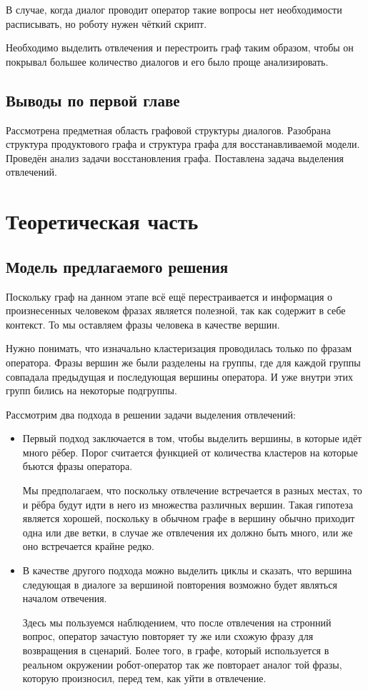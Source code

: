 \documentclass[specification,annotation]{itmo-student-thesis}
\begin{document}
	В случае, когда диалог проводит оператор такие вопросы нет необходимости расписывать, но роботу нужен чёткий скрипт.
	
	Необходимо выделить отвлечения и перестроить граф таким образом, чтобы он покрывал большее количество диалогов и его было проще анализировать.
	
	\section{Выводы по первой главе}
	Рассмотрена предметная область графовой структуры диалогов. Разобрана структура продуктового графа и структура графа для восстанавливаемой модели. Проведён анализ задачи восстановления графа. Поставлена задача выделения отвлечений. 
	
	\chapter{Теоретическая часть}
	\section{Модель предлагаемого решения}
	Поскольку граф на данном этапе всё ещё перестраивается и информация о произнесенных человеком фразах является полезной, так как содержит в себе контекст. То мы оставляем фразы человека в качестве вершин.
	
	Нужно понимать, что изначально кластеризация проводилась только по фразам оператора. Фразы вершин же были разделены на группы, где для каждой группы совпадала предыдущая и последующая вершины оператора. И уже внутри этих групп бились на некоторые подгруппы.
	
	Рассмотрим два подхода в решении задачи выделения отвлечений:
	
	\begin{itemize}
		\item Первый подход заключается в том, чтобы выделить вершины, в которые идёт много рёбер. Порог считается функцией от количества кластеров на которые бъются фразы оператора.
		
		Мы предполагаем, что поскольку отвлечение встречается в разных местах, то и рёбра будут идти в него из множества различных вершин. Такая гипотеза является хорошей, поскольку в обычном графе в вершину обычно приходит одна или две ветки, в случае же отвлечения их должно быть много, или же оно встречается крайне редко.
		
		\item В качестве другого подхода можно выделить циклы и сказать, что вершина следующая в диалоге за вершиной повторения возможно будет являться началом отвечения.
		
		Здесь мы пользуемся наблюдением, что после отвлечения на стронний вопрос, оператор зачастую повторяет ту же или схожую фразу для возвращения в сценарий. Более того, в графе, который используется в реальном окружении робот-оператор так же повторает аналог той фразы, которую произносил, перед тем, как уйти в отвлечение.
	\end{itemize}
	
\end{document}
